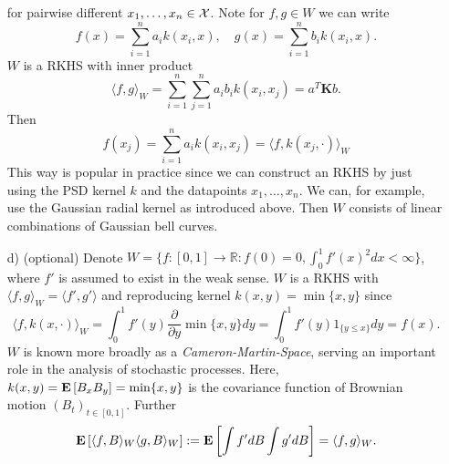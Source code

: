 \begin{example}[RKHS]
\begin{itemize}
	for pairwise different $x_1, \ldots, x_n \in \mathcal{X}$. Note for $f, g \in W$ we can write
	\begin{equation*}
		f(x) = \sum_{i=1}^n a_i k(x_i, x), \quad g(x) = \sum_{i=1}^n b_i k(x_i, x).
	\end{equation*}
	$W$ is a RKHS with inner product
	\begin{equation*}
		\langle f, g \rangle_W = \sum_{i=1}^n\sum_{j=1}^n a_i b_i k(x_i, x_j) = a^T\mathbf{K}b.
	\end{equation*}
	Then
	\begin{equation*}
		f(x_j) = \sum_{i=1}^n a_i k(x_i, x_j) = \langle f, k(x_j, \cdot ) \rangle_W
	\end{equation*}
	This way is popular in practice since we can construct an RKHS by just using the PSD kernel $k$ and the datapoints $x_1, \ldots, x_n$. We can, for example, use the Gaussian radial kernel as introduced above. Then $W$ consists of linear combinations of Gaussian bell curves. %
	\item[d)] (optional) Denote $W = \{f \colon [0, 1] \rightarrow \mathbb{R} : f(0) = 0, \int_0^1 f'(x)^2 dx < \infty \}$, where $f'$ is assumed to exist in the weak sense. $W$ is a RKHS with $\langle f, g \rangle_W = \langle f', g' \rangle$ and reproducing kernel $k(x, y) = \min\{x, y\}$ since
	\begin{equation*}
		\langle f, k(x, \cdot) \rangle_W = \int_0^1 f'(y)\frac{\partial }{\partial y} \min\{x, y\}dy = \int_0^1 f'(y)1_{\{y \leq x\}} dy = f(x).
	\end{equation*}
	$W$ is known more broadly as a \emph{Cameron-Martin-Space}, serving an important role in the analysis of stochastic processes. Here, $k(x, y) = \mathbf{E}\left[B_xB_y \right] = \min\{x, y\}$ is the covariance function of Brownian motion $(B_t)_{t \in [0, 1]}$. Further
	\begin{equation*}
		\mathbf{E}\left[\langle f, B \rangle_W \langle g, B  \rangle_W \right] := \mathbf{E}\left[\int f' dB \int g' dB \right] = \langle f, g \rangle_W.
	\end{equation*}
\end{itemize}
\end{example}

